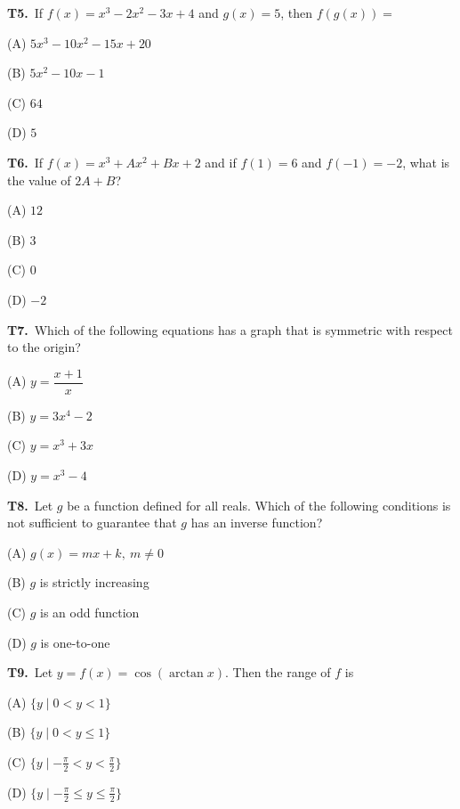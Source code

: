 \documentclass[11pt]{article}
\begin{document}
\bigskip\noindent\textbf{T5.}\ If $f(x) = x^3 - 2x^2 - 3x + 4$ and $g(x) = 5$, then $f(g(x)) =$
\begin{list}{}{\setlength{\leftmargin}{3em}\setlength{\labelwidth}{2.5em}\setlength{\itemsep}{0pt}\setlength{\topsep}{2pt}}
\item[(A)] $5x^3 - 10x^2 - 15x + 20$
\item[(B)] $5x^2 - 10x - 1$
\item[(C)] $64$
\item[(D)] $5$
\end{list}

\bigskip\noindent\textbf{T6.}\ If $f(x) = x^3 + Ax^2 + Bx + 2$ and if $f(1) = 6$ and $f(-1) = -2$, what is the value of $2A + B$?
\begin{list}{}{\setlength{\leftmargin}{3em}\setlength{\labelwidth}{2.5em}\setlength{\itemsep}{0pt}\setlength{\topsep}{2pt}}
\item[(A)] $12$
\item[(B)] $3$
\item[(C)] $0$
\item[(D)] $-2$
\end{list}

\bigskip\noindent\textbf{T7.}\ Which of the following equations has a graph that is symmetric with respect to the origin?
\begin{list}{}{\setlength{\leftmargin}{3em}\setlength{\labelwidth}{2.5em}\setlength{\itemsep}{0pt}\setlength{\topsep}{2pt}}
\item[(A)] $y = \dfrac{x+1}{x}$
\item[(B)] $y = 3x^4 - 2$
\item[(C)] $y = x^3 + 3x$
\item[(D)] $y = x^3 - 4$
\end{list}

\bigskip\noindent\textbf{T8.}\ Let $g$ be a function defined for all reals. Which of the following conditions is not sufficient to guarantee that $g$ has an inverse function?
\begin{list}{}{\setlength{\leftmargin}{3em}\setlength{\labelwidth}{2.5em}\setlength{\itemsep}{0pt}\setlength{\topsep}{2pt}}
\item[(A)] $g(x) = mx + k,\ m \neq 0$
\item[(B)] $g$ is strictly increasing
\item[(C)] $g$ is an odd function
\item[(D)] $g$ is one-to-one
\end{list}

\bigskip\noindent\textbf{T9.}\ Let $y = f(x) = \cos(\arctan x)$. Then the range of $f$ is
\begin{list}{}{\setlength{\leftmargin}{3em}\setlength{\labelwidth}{2.5em}\setlength{\itemsep}{0pt}\setlength{\topsep}{2pt}}
\item[(A)] $\{y \mid 0 < y < 1\}$
\item[(B)] $\{y \mid 0 < y \leq 1\}$
\item[(C)] $\{y \mid -\tfrac{\pi}{2} < y < \tfrac{\pi}{2}\}$
\item[(D)] $\{y \mid -\tfrac{\pi}{2} \leq y \leq \tfrac{\pi}{2}\}$
\end{list}
\end{document}
